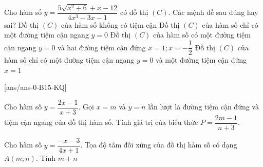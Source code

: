\begin{ex}%
	Cho hàm số $y=\dfrac{5\sqrt{x^2+6}+x-12}{4x^3-3x-1}$ có đồ thị $(C)$. Các mệnh đề sau đúng hay sai?
\choiceTF
{Đồ thị $(C)$ của hàm số không có tiệm cận}
{Đồ thị $(C)$ của hàm số chỉ có một đường tiệm cận ngang $y=0$}
{Đồ thị $(C)$ của hàm số có một đường tiệm cận ngang $y=0$ và hai đường tiệm cận đứng $x=1; x=-\dfrac{1}{2}$}
{\True Đồ thị $(C)$ của hàm số chỉ có một đường tiệm cận ngang $y=0$ và một đường tiệm cận đứng $x=1$}
\end{ex}


[ans/ans-0-B15-KQ]

\caukq%
\begin{ex}%
	Cho hàm số $y=\dfrac{2x-1}{x+3}$. Gọi $x=m$ và $y=n$ lần lượt là đường tiệm cận đứng và tiệm cận ngang của đồ thị hàm số. Tính giá trị của biểu thức $P=\dfrac{2m-1}{n+3}$.
\end{ex}

\begin{ex}%
	Cho hàm số $y=\dfrac{-x-3}{4x+1}$. Tọa độ tâm đối xứng của đồ thị hàm số có dạng $A(m;n)$. Tính $m+n$
\end{ex}

